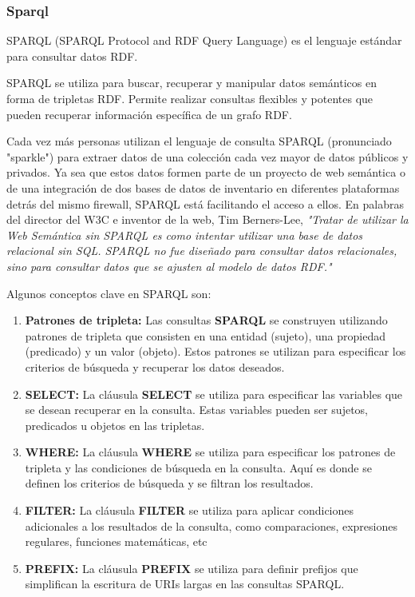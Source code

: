 \documentclass[12pt]{article}
\begin{document}
\subsubsection{Sparql}

SPARQL (SPARQL Protocol and RDF Query Language) es el lenguaje estándar para consultar datos RDF. \citep{ref21}

SPARQL se utiliza para buscar, recuperar y manipular datos semánticos en forma de tripletas RDF. Permite realizar consultas flexibles y potentes que pueden recuperar información específica de un grafo RDF.

Cada vez más personas utilizan el lenguaje de consulta SPARQL (pronunciado "sparkle") para extraer datos de una colección cada vez mayor de datos públicos y privados. Ya sea que estos datos formen parte de un proyecto de web semántica o de una integración de dos bases de datos de inventario en diferentes plataformas detrás del mismo firewall, SPARQL está facilitando el acceso a ellos. En palabras del director del W3C e inventor de la web, Tim Berners-Lee, \textit{"Tratar de utilizar la Web Semántica sin SPARQL es como intentar utilizar una base de datos relacional sin SQL. SPARQL no fue diseñado para consultar datos relacionales, sino para consultar datos que se ajusten al modelo de datos RDF."} \citep{ref25}

Algunos conceptos clave en SPARQL son:

\begin{enumerate}
    \item {
        
        \textbf{Patrones de tripleta:} Las consultas \textbf{SPARQL} se construyen utilizando patrones de tripleta que consisten en una entidad (sujeto), una propiedad (predicado) y un valor (objeto). Estos patrones se utilizan para especificar los criterios de búsqueda y recuperar los datos deseados.
    }
    \item {
       
        \textbf{SELECT:} La cláusula \textbf{SELECT} se utiliza para especificar las variables que se desean recuperar en la consulta. Estas variables pueden ser sujetos, predicados u objetos en las tripletas.
    }
    \item {
        \textbf{WHERE:} La cláusula \textbf{WHERE} se utiliza para especificar los patrones de tripleta y las condiciones de búsqueda en la consulta. Aquí es donde se definen los criterios de búsqueda y se filtran los resultados.
    }
    \item {
        \textbf{FILTER:} La cláusula \textbf{FILTER} se utiliza para aplicar condiciones adicionales a los resultados de la consulta, como comparaciones, expresiones regulares, funciones matemáticas, etc
    }
    \item {
        \textbf{PREFIX:} La cláusula \textbf{PREFIX} se utiliza para definir prefijos que simplifican la escritura de URIs largas en las consultas SPARQL.
    }
        
\end{enumerate}
\end{document}
